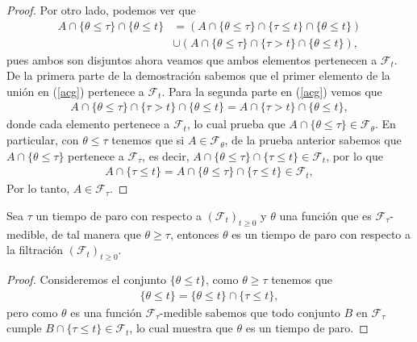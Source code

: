 \begin{proof}
\noindent Por otro lado, podemos ver que 
	\begin{align}
		A \cap \{\theta \leq \tau\} \cap \{\theta \leq t\} & = \left( A \cap \{\theta \leq \tau\} \cap \{\tau \leq t\} \cap \{\theta \leq t\} \right) \nonumber \\
		& \cup \left( A \cap \{\theta \leq \tau\} \cap \{\tau > t\} \cap \{\theta \leq t\} \right), \label{acg}
	\end{align}
pues ambos son disjuntos ahora veamos que ambos elementos pertenecen a $\mathcal{F}_t$. De la primera parte de la demostración sabemos que el primer elemento de la unión en (\ref{acg}) pertenece a $\mathcal{F}_t$. Para la segunda parte en (\ref{acg}) vemos que
	\begin{align*}
		A \cap \{\theta \leq \tau\} \cap \{\tau > t\} \cap \{\theta \leq t\} = A \cap \{\tau > t\} \cap \{\theta \leq t\},
	\end{align*}
	donde cada elemento pertenece a $\mathcal{F}_t$, lo cual prueba que $A \cap \{\theta \leq \tau\} \in \mathcal{F}_{\theta}$. En particular, con $\theta \leq \tau$ tenemos que si $A \in \mathcal{F}_{\theta}$, de la prueba anterior sabemos que $A \cap \{ \theta \leq \tau \}$ pertenece a $\mathcal{F}_{\tau}$, es decir, $A \cap \{ \theta \leq \tau \} \cap \{ \tau \leq t \} \in \mathcal{F}_t$, por lo que 
	\begin{align*}
		A \cap \{ \tau \leq t \} = A \cap \{ \theta \leq \tau \} \cap \{ \tau \leq t \} \in \mathcal{F}_t,
	\end{align*}
Por lo tanto, $A \in \mathcal{F}_{\tau}.$
\end{proof}

\begin{lemma}
	\label{nosequeponer}
	Sea $\tau$ un tiempo de paro con respecto a $(\mathcal{F}_t)_{t \geq 0}$ y $\theta$ una función que es $\mathcal{F}_{\tau}$-medible, de tal manera que $\theta \geq \tau$, entonces $\theta$ es un tiempo de paro con respecto a la filtración $(\mathcal{F}_t)_{t \geq 0}$.
\end{lemma}
\begin{proof}
	Consideremos el conjunto $\{ \theta \leq t \}$, como $\theta \geq \tau$ tenemos que
	\begin{align*}
		\{\theta \leq t\} = \{\theta \leq t\} \cap \{\tau \leq t\},
	\end{align*}
	pero como $\theta$ es una función $\mathcal{F}_{\tau}$-medible sabemos que todo conjunto $B$ en $\mathcal{F}_{\tau}$ cumple $B \cap \{\tau \leq t\} \in \mathcal{F}_t$, lo cual muestra que $\theta$ es un tiempo de paro.
\end{proof}

